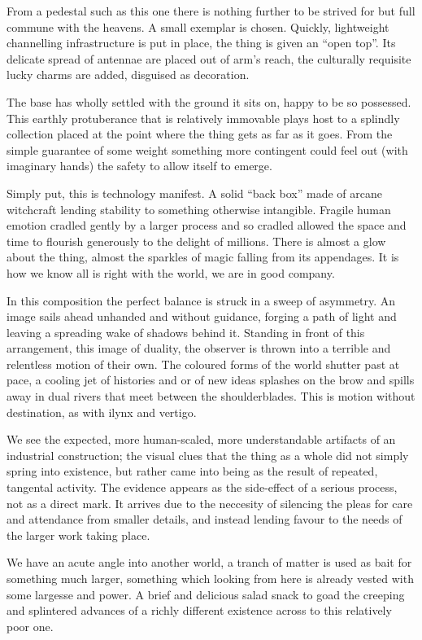 \documentclass{book}
\begin{document}
From a pedestal such as this one there is nothing further to be strived for but
full commune with the heavens. A small exemplar is chosen. Quickly, lightweight
channelling infrastructure is put in place, the thing is given an ``open top''.
Its delicate spread of antennae are placed out of arm's reach, the culturally
requisite lucky charms are added, disguised as decoration.

The base has wholly settled with the ground it sits on, happy to be so
possessed. This earthly protuberance that is relatively immovable plays host to
a splindly collection placed at the point where the thing gets as far as it
goes. From the simple guarantee of some weight something more contingent could
feel out (with imaginary hands) the safety to allow itself to emerge.

Simply put, this is technology manifest. A solid ``back box'' made of arcane
witchcraft lending stability to something otherwise intangible. Fragile human
emotion cradled gently by a larger process and so cradled allowed the space and
time to flourish generously to the delight of millions. There is almost a glow
about the thing, almost the sparkles of magic falling from its appendages. It
is how we know all is right with the world, we are in good company.

In this composition the perfect balance is struck in a sweep of asymmetry. An
image sails ahead unhanded and without guidance, forging a path of light and
leaving a spreading wake of shadows behind it. Standing in front of this
arrangement, this image of duality, the observer is thrown into a terrible and
relentless motion of their own. The coloured forms of the world shutter past at
pace, a cooling jet of histories and or of new ideas splashes on the brow and
spills away in dual rivers that meet between the shoulderblades. This is motion
without destination, as with ilynx and vertigo.

We see the expected, more human-scaled, more understandable artifacts of an
industrial construction; the visual clues that the thing as a whole did not
simply spring into existence, but rather came into being as the result of
repeated, tangental activity. The evidence appears as the side-effect of a
serious process, not as a direct mark. It arrives due to the neccesity of
silencing the pleas for care and attendance from smaller details, and instead
lending favour to the needs of the larger work taking place.

We have an acute angle into another world, a tranch of matter is used as bait
for something much larger, something which looking from here is already vested
with some largesse and power. A brief and delicious salad snack to goad the
creeping and splintered advances of a richly different existence across to this
relatively poor one.
\end{document}
